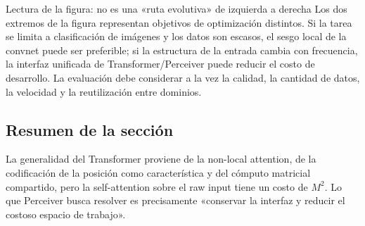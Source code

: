 \begin{knowledgebox}{Lectura de la figura: no es una «ruta evolutiva» de izquierda a derecha}
Los dos extremos de la figura representan objetivos de optimización distintos. Si la tarea se limita a clasificación de imágenes y los datos son escasos, el sesgo local de la convnet puede ser preferible; si la estructura de la entrada cambia con frecuencia, la interfaz unificada de Transformer/Perceiver puede reducir el costo de desarrollo. La evaluación debe considerar a la vez la calidad, la cantidad de datos, la velocidad y la reutilización entre dominios.
\end{knowledgebox}

\subsection{Resumen de la sección}

La generalidad del Transformer proviene de la non-local attention, de la codificación de la posición como característica y del cómputo matricial compartido, pero la self-attention sobre el raw input tiene un costo de $M^2$. Lo que Perceiver busca resolver es precisamente «conservar la interfaz y reducir el costoso espacio de trabajo».
